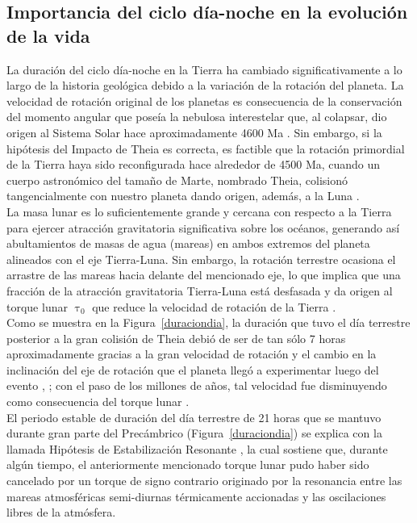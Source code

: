 \subsection{Importancia del ciclo día-noche en la evolución de la vida}

La duración del ciclo día-noche en la Tierra ha cambiado significativamente a lo largo de la historia geológica debido a la variación de la rotación del planeta. La velocidad de rotación original de los planetas  es consecuencia de la conservación del momento angular que poseía la nebulosa interestelar que, al colapsar, dio origen al Sistema Solar hace aproximadamente 4600 Ma \citep{Greaves2005}. Sin embargo, si la hipótesis del Impacto de Theia es correcta, es factible que la rotación primordial de la Tierra haya sido reconfigurada hace alrededor de 4500 Ma, cuando un cuerpo astronómico del tamaño de Marte, nombrado Theia, colisionó tangencialmente con nuestro planeta dando origen, además, a la Luna \citep{Stevenson1987}.\\

La masa lunar es lo suficientemente grande y cercana con respecto a la Tierra para ejercer atracción gravitatoria significativa sobre los océanos, generando así abultamientos de masas de agua (mareas) en ambos extremos del planeta alineados con el eje Tierra-Luna. Sin embargo, la rotación terrestre ocasiona el arrastre de las mareas hacia delante del mencionado eje, lo que implica que una fracción de la atracción gravitatoria Tierra-Luna está desfasada y da origen al torque lunar $\uptau_0$ que reduce la velocidad de rotación de la Tierra \citep{Conway1982}.\\ 

Como se muestra en la Figura~\ref{duraciondia}, la duración que tuvo el día terrestre posterior a la gran colisión de Theia debió de ser de tan sólo 7 horas aproximadamente gracias a la gran velocidad de rotación y el cambio en la inclinación del eje de rotación que el planeta llegó a experimentar luego del evento \citep{Stevenson&Bartlett2016}, \citep{Stevenson1987}; con el paso de los millones de años, tal velocidad fue disminuyendo como consecuencia del torque lunar \citep{Conway1982}.\\ 

El periodo estable de duración del día terrestre de 21 horas que se mantuvo durante gran parte del Precámbrico (Figura~\ref{duraciondia}) se explica con la llamada Hipótesis de Estabilización Resonante \citep{Zahnle&Walker1987}, la cual sostiene que, durante algún tiempo, el anteriormente mencionado torque lunar pudo haber sido cancelado por un torque de signo contrario originado por la resonancia entre las mareas atmosféricas semi-diurnas térmicamente accionadas y las oscilaciones libres de la atmósfera.\\

